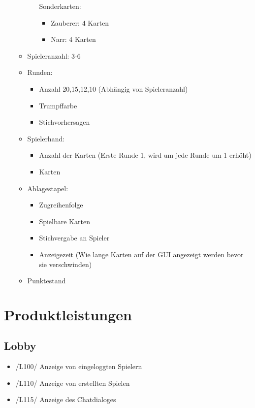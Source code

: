 \documentclass{article}
\begin{document}
\begin{itemize}
\begin{itemize}
\begin{itemize}
			Sonderkarten:
			\begin{itemize}
				\item Zauberer: 4 Karten
				\item Narr: 4 Karten
			\end{itemize}

		\end{itemize}
			\item Spieleranzahl: 3-6
			\item Runden:
			\begin{itemize}
				\item Anzahl 20,15,12,10 (Abhängig von Spieleranzahl)
				\item Trumpffarbe
				\item Stichvorhersagen
			\end{itemize}
			\item Spielerhand:
			\begin{itemize}
				\item Anzahl der Karten (Erste Runde 1, wird um jede Runde um 1 erhöht)
				\item Karten
			\end{itemize}
			\item Ablagestapel:
			\begin{itemize}
				\item Zugreihenfolge
				\item Spielbare Karten
				\item Stichvergabe an Spieler
				\item Anzeigezeit (Wie lange Karten auf der GUI angezeigt werden bevor sie verschwinden)
			\end{itemize}
			\item Punktestand
		\end{itemize}
\end{itemize}


\section{Produktleistungen}
\subsection{\gls{Lobby}}
\begin{itemize}
	\item /L100/ Anzeige von eingeloggten Spielern
	\item /L110/ Anzeige von erstellten Spielen	
	\item /L115/ Anzeige des Chatdialoges		
\end{itemize}
\end{document}
